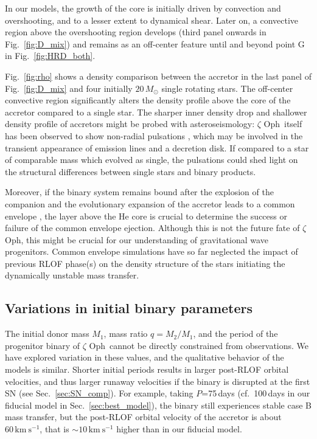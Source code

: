 \documentclass[twocolumn,twocolappendix,trackchanges]{aastex63}
\newcommand{\kms}{{\mathrm{km\ s^{-1}}}}
\DeclareRobustCommand{\Figref}[1]{Fig.~\ref{#1}}
\DeclareRobustCommand{\Secref}[1]{Sec.~\ref{#1}}
\newcommand{\zoph}{$\zeta$ Oph}
\begin{document}
In our models, the growth of the core is initially driven by
convection and overshooting, and to a lesser extent to dynamical
shear. Later on, a convective region above the overshooting region
develops (third panel onwards in \Figref{fig:D_mix}) and remains as an off-center feature until and beyond point G
in \Figref{fig:HRD_both}.

\Figref{fig:rho} shows a density comparison between the accretor in
the last panel of \Figref{fig:D_mix} and four initially $20\,M_\odot$
single rotating stars. The off-center convective region significantly
alters the density profile above the core of the accretor compared to
a single star. The sharper inner density drop and shallower density
profile of accretors might be probed with asteroseismology: \zoph\
itself has been observed to show non-radial pulsations
\citep{walker:05}, which may be involved in the transient appearance of
emission lines and a decretion disk. If compared to a star of comparable mass which
evolved as single, the pulsations could shed light on the structural
differences between single stars and binary products.

Moreover, if the binary system remains bound after the explosion of
the companion and the evolutionary expansion of the accretor leads
to a common envelope \citep[e.g.,][]{paczynski:76}, the layer above
the He core is crucial to determine the success or failure of the
common envelope ejection. Although this is not the future fate of
\zoph, this might be crucial for our understanding of gravitational
wave progenitors.  Common envelope simulations have so far
neglected the impact of previous RLOF phase(s) on the density
structure of the stars initiating the dynamically unstable mass
transfer.

\subsection{Variations in initial binary parameters}
\label{sec:bin_init}

The initial donor mass $M_1$, mass ratio $q=M_2/M_1$, and the period
of the progenitor binary of \zoph\ cannot be directly constrained from
observations. We have explored variation in these values, and the
qualitative behavior of the models is similar.
Shorter initial periods results in larger post-RLOF orbital
velocities, and thus larger runaway velocities if the binary is
disrupted at the first SN (see \Secref{sec:SN_comp}). For example, taking $P$=75\,days
(cf.\ 100\,days in our fiducial model in \Secref{sec:best_model}), the
binary still experiences stable case B mass transfer, but the
post-RLOF orbital velocity of the accretor is about $60\,\kms$, that
is $\sim$$10\,\kms$ higher
than in our fiducial model.
\end{document}
